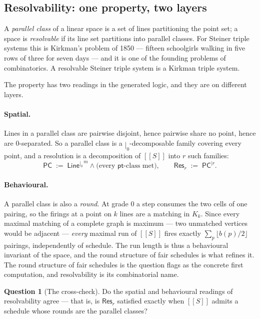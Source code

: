 \documentclass[11pt]{article}
\theoremstyle{plain}
\theoremstyle{definition}
\newtheorem{question}[theorem]{Question}
\newcommand{\enc}[1]{[\![#1]\!]}
\newcommand{\bmid}{\mathbin{|}}
\newcommand{\Line}{\mathsf{Line}}
\newcommand{\pt}{\mathsf{pt}}
\newcommand{\PC}{\mathsf{PC}}
\newcommand{\Res}{\mathsf{Res}}
\begin{document}
\subsection{Resolvability: one property, two layers}
\label{sec:resolvable}

A \emph{parallel class} of a linear space is a set of lines partitioning the point set; a space is
\emph{resolvable} if its line set partitions into parallel classes. For Steiner triple systems this
is Kirkman's problem of 1850 --- fifteen schoolgirls walking in five rows of three for seven days
--- and it is one of the founding problems of combinatorics. A resolvable Steiner triple system is
a Kirkman triple system.

The property has two readings in the generated logic, and they are on different layers.

\paragraph{Spatial.} Lines in a parallel class are pairwise disjoint, hence pairwise share no
point, hence are $0$-separated. So a parallel class is a $\bmid_0$-decomposable family covering
every point, and a resolution is a decomposition of $\enc{S}$ into $r$ such families:
\[
\PC \;:=\; \Line^{\bmid_0 \, m} \wedge \text{(every $\pt$-class met)}, \qquad
\Res_r \;:=\; \PC^{\bmid r}.
\]

\paragraph{Behavioural.} A parallel class is also a \emph{round}. At grade 0 a step consumes the
two cells of one pairing, so the firings at a point on $k$ lines are a matching in $K_k$. Since
every maximal matching of a complete graph is maximum --- two unmatched vertices would be adjacent
--- \emph{every} maximal run of $\enc{S}$ fires exactly $\sum_p \lfloor b(p)/2 \rfloor$ pairings,
independently of schedule. The run length is thus a behavioural invariant of the space, and the
round structure of fair schedules is what refines it.
The round structure of fair schedules is the question \cite[\S9]{Geometry} flags as the concrete
first computation, and resolvability is its combinatorial name.

\begin{question}[The cross-check]
\label{q:cross}
Do the spatial and behavioural readings of resolvability agree --- that is, is $\Res_r$ satisfied
exactly when $\enc{S}$ admits a schedule whose rounds are the parallel classes?
\end{question}
\end{document}
